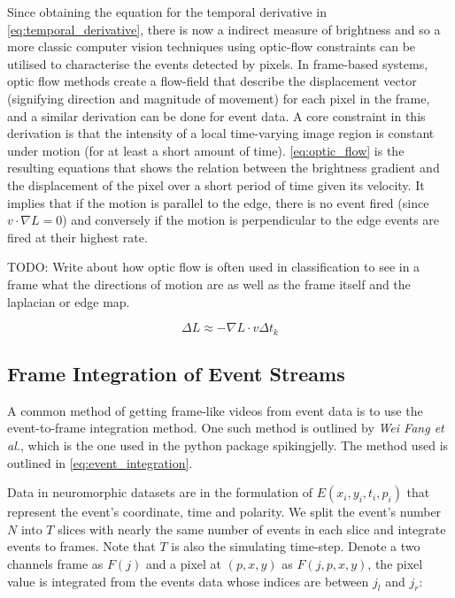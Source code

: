 Since obtaining the equation for the temporal derivative in \cref{eq:temporal_derivative}, there is now a indirect measure of brightness and so a more classic computer vision techniques using optic-flow constraints can be utilised to characterise the events detected by pixels. In frame-based systems, optic flow methods create a flow-field that describe the displacement vector (signifying direction and magnitude of movement) for each pixel in the frame, and a similar derivation can be done for event data. A core constraint in this derivation is that the intensity of a local time-varying image region is constant under motion (for at least a short amount of time)\cite{GenerativeEventModel}. \cref{eq:optic_flow} is the resulting equations that shows the relation between the brightness gradient and the displacement of the pixel over a short period of time given its velocity\cite{EventBasedVisionASurvery}. It implies that if the motion is parallel to the edge, there is no event fired (since $ v \cdot \nabla L = 0  $) and conversely if the motion is perpendicular to the edge events are fired at their highest rate.

\color{red} TODO: Write about how optic flow is often used in classification to see in a frame what the directions of motion are as well as the frame itself and the laplacian or edge map. \color{black}

\begin{equation}
      \Delta L \approx -\nabla L \cdot v \Delta t_k
      \label{eq:optic_flow}
\end{equation}

\subsection{Frame Integration of Event Streams} \label{ssec:frame_integration}

A common method of getting frame-like videos from event data is to use the event-to-frame integration method. One such method is outlined by \textit{Wei Fang et al.}\cite{LearnableMembraneSNN}, which is the one used in the python package spikingjelly\cite{SpikingJelly}. The method used is outlined in \cref{eq:event_integration}.

Data in neuromorphic datasets are in the formulation of $ E(x_i, y_i, t_i, p_i) $ that represent the event's coordinate, time and polarity. We split the event's number $ N $ into $ T $ slices with nearly the same number of events in each slice and integrate events to frames. Note that $ T $ is also the simulating time-step. Denote a two channels frame as $ F(j) $ and a pixel at $ (p, x, y) $ as $ F(j, p, x, y) $, the pixel value is integrated from the events data whose indices are between $ j_l $ and $ j_r $:

